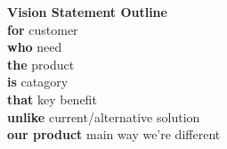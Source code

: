 \documentclass[11pt]{article}
\begin{document}
\textbf{Vision Statement Outline}\\
\textbf{for} customer \\
\textbf{who} need  \\
\textbf{the} product \\
\textbf{is} catagory \\
\textbf{that} key benefit \\
\textbf{unlike} current/alternative solution \\
\textbf{our product} main way we're different \\
\end{document}
